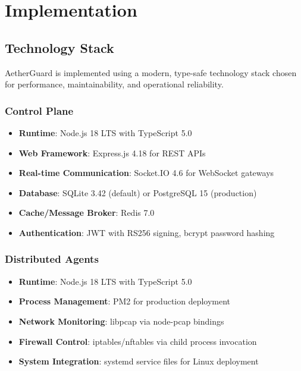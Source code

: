 
\section{Implementation}
\label{sec:implementation}

\subsection{Technology Stack}
\label{subsec:tech-stack}

AetherGuard is implemented using a modern, type-safe technology stack chosen for performance, maintainability, and operational reliability.

\subsubsection{Control Plane}

\begin{itemize}
    \item \textbf{Runtime}: Node.js 18 LTS with TypeScript 5.0
    \item \textbf{Web Framework}: Express.js 4.18 for REST APIs
    \item \textbf{Real-time Communication}: Socket.IO 4.6 for WebSocket gateways
    \item \textbf{Database}: SQLite 3.42 (default) or PostgreSQL 15 (production)
    \item \textbf{Cache/Message Broker}: Redis 7.0
    \item \textbf{Authentication}: JWT with RS256 signing, bcrypt password hashing
\end{itemize}

\subsubsection{Distributed Agents}

\begin{itemize}
    \item \textbf{Runtime}: Node.js 18 LTS with TypeScript 5.0
    \item \textbf{Process Management}: PM2 for production deployment
    \item \textbf{Network Monitoring}: libpcap via node-pcap bindings
    \item \textbf{Firewall Control}: iptables/nftables via child process invocation
    \item \textbf{System Integration}: systemd service files for Linux deployment
\end{itemize}

